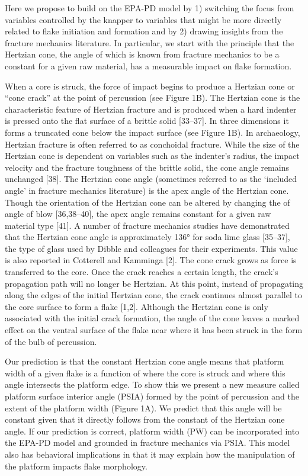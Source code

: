 \documentclass[10pt,letterpaper]{article}
\begin{document}
Here we propose to build on the EPA-PD model by 1) switching the focus
from variables controlled by the knapper to variables that might be more
directly related to flake initiation and formation and by 2) drawing
insights from the fracture mechanics literature. In particular, we start
with the principle that the Hertzian cone, the angle of which is known
from fracture mechanics to be a constant for a given raw material, has a
measurable impact on flake formation.

When a core is struck, the force of impact begins to produce a Hertzian
cone or ``cone crack'' at the point of percussion (see Figure 1B). The
Hertzian cone is the characteristic feature of Hertzian fracture and is
produced when a hard indenter is pressed onto the flat surface of a
brittle solid {[}33--37{]}. In three dimensions it forms a truncated
cone below the impact surface (see Figure 1B). In archaeology, Hertzian
fracture is often referred to as conchoidal fracture. While the size of
the Hertzian cone is dependent on variables such as the indenter's
radius, the impact velocity and the fracture toughness of the brittle
solid, the cone angle remains unchanged {[}38{]}. The Hertzian cone
angle (sometimes referred to as the `included angle' in fracture
mechanics literature) is the apex angle of the Hertzian cone. Though the
orientation of the Hertzian cone can be altered by changing the of angle
of blow {[}36,38--40{]}, the apex angle remains constant for a given raw
material type {[}41{]}. A number of fracture mechanics studies have
demonstrated that the Hertzian cone angle is approximately 136° for soda
lime glass {[}35--37{]}, the type of glass used by Dibble and colleagues
for their experiments. This value is also reported in Cotterell and
Kamminga {[}2{]}. The cone crack grows as force is transferred to the
core. Once the crack reaches a certain length, the crack's propagation
path will no longer be Hertzian. At this point, instead of propagating
along the edges of the initial Hertzian cone, the crack continues almost
parallel to the core surface to form a flake {[}1,2{]}. Although the
Hertzian cone is only associated with the initial crack formation, the
angle of the cone leaves a marked effect on the ventral surface of the
flake near where it has been struck in the form of the bulb of
percussion.

Our prediction is that the constant Hertzian cone angle means that
platform width of a given flake is a function of where the core is
struck and where this angle intersects the platform edge. To show this
we present a new measure called platform surface interior angle (PSIA)
formed by the point of percussion and the extent of the platform width
(Figure 1A). We predict that this angle will be constant given that it
directly follows from the constant of the Hertzian cone angle. If our
prediction is correct, platform width (PW) can be incorporated into the
EPA-PD model and grounded in fracture mechanics via PSIA. This model
also has behavioral implications in that it may explain how the
manipulation of the platform impacts flake morphology.
\end{document}
